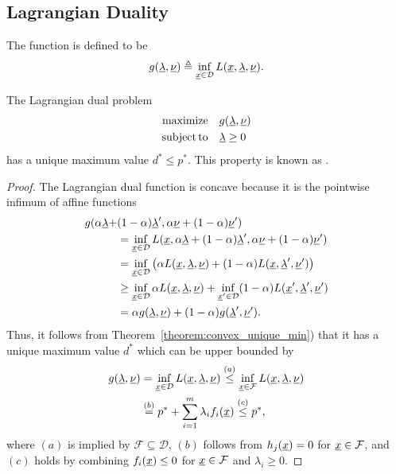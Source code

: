 \subsection{Lagrangian Duality}


\begin{definition}
The  function is defined to be
\[ g(\underline{\lambda},\underline{\nu}) \triangleq \inf_{\underline{x}\in \mathcal{D}} L(\underline{x},\underline{\lambda},\underline{\nu}). \]
\end{definition}


\begin{lemma}
The Lagrangian dual problem
\begin{align*}
\mathrm{maximize} \quad & g(\underline{\lambda},\underline{\nu}) \\
\mathrm{subject\,to} \quad & \underline{\lambda} \geq 0
\end{align*}
has a unique maximum value $d^* \leq p^*$.
This property is known as .
\end{lemma}

\begin{proof}
The Lagrangian dual function is concave because it is the pointwise infimum of affine functions
\begin{align*}
g(\alpha\underline{\lambda}+&(1-\alpha)\underline{\lambda}',\alpha\underline{\nu}+(1-\alpha)\underline{\nu}') \\
&= \inf_{\underline{x}\in \mathcal{D}} L(\underline{x},\alpha\underline{\lambda}+(1-\alpha)\underline{\lambda}',\alpha\underline{\nu}+(1-\alpha) \underline{\nu}') \\
&= \inf_{\underline{x}\in \mathcal{D}} \big( \alpha L(\underline{x},\underline{\lambda},\underline{\nu}) + (1-\alpha) L(\underline{x},\underline{\lambda}',\underline{\nu}') \big) \\
&\geq \inf_{\underline{x}\in \mathcal{D}} \alpha L(\underline{x},\underline{\lambda},\underline{\nu}) + \inf_{\underline{x}'\in \mathcal{D}} (1-\alpha) L(\underline{x}',\underline{\lambda}',\underline{\nu}') \\
&= \alpha g(\underline{\lambda},\underline{\nu}) + (1-\alpha) g(\underline{\lambda}',\underline{\nu}').
\end{align*}
Thus, it follows from Theorem~\ref{theorem:convex_unique_min}) that it has a unique maximum value $d^*$ which can be upper bounded by
\begin{align*}
g(\underline{\lambda},\underline{\nu})
&= \inf_{\underline{x}\in \mathcal{D}} L(\underline{x},\underline{\lambda},\underline{\nu})
\stackrel{(a)}{\leq} \inf_{\underline{x}\in \mathcal{F}} L(\underline{x},\underline{\lambda},\underline{\nu}) \\
&\stackrel{(b)}{=} p^* + \sum_{i=1}^m \lambda_i f_i (\underline{x})
\stackrel{(c)}{\leq} p^*,
\end{align*}
where $(a)$ is implied by $\mathcal{F} \subseteq \mathcal{D}$, $(b)$ follows from $h_j(\underline{x}) = 0$ for $\underline{x}\in \mathcal{F}$, and $(c)$ holds by combining $f_i(\underline{x}) \leq 0$ for $\underline{x}\in \mathcal{F}$ and $\lambda_i \geq 0$.
\end{proof}

